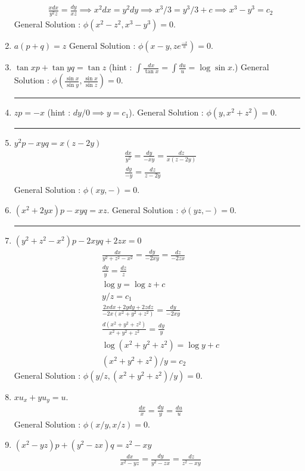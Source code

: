 \begin{enumerate}
\begin{align*}
			& \frac{xdx}{y^2z} = \frac{dy}{xz} \implies x^2dx = y^2dy \implies x^3/3 = y^3/3 + c \implies x^3-y^3 = c_2
		\end{align*}
		General Solution : $\phi(x^2-z^2,x^3-y^3) = 0$.
	\item $a(p+q) = z$
		General Solution : $\phi(x-y, ze^\frac{-x}{a}) = 0$.
	\item $\tan x p + \tan y q = \tan z$ 
		(hint : $\int \frac{dx}{\tan x} = \int \frac{du}{u} = \log \sin x$.)
		General Solution : $\phi\left(\frac{\sin x }{\sin y},\frac{\sin x}{\sin z}\right) = 0$.
		\hrule
	\item $zp = -x$
		(hint : $dy/0 \implies y = c_1$).
		General Solution : $\phi(y,x^2+z^2) = 0$.
		\hrule
	\item $y^2p - xyq = x(z-2y)$
		\begin{align*}
			& \frac{dx}{y^2} = \frac{dy}{-xy} = \frac{dz}{x(z-2y)} \\
			& \frac{dy}{-y} = \frac{dz}{z-2y} \\
		\end{align*}
		General Solution : $\phi(xy,-)= 0$.
	\item $(x^2+2yx)p - xyq = xz$.
		General Solution : $\phi(yz,-) = 0$.
		\hrule
	\item $(y^2+z^2-x^2)p - 2xyq + 2zx = 0$
		\begin{align*}
			& \frac{dx}{y^2+z^2-x^2} = \frac{dy}{-2xy} = \frac{dz}{-2zx} \\
			& \frac{dy}{y} = \frac{dz}{z} \\
			& \log y = \log z + c \\
			& y/z = c_1 \\
			& \frac{2xdx+2ydy+2zdz}{-2x(x^2+y^2+z^2)} = \frac{dy}{-2xy} \\
			& \frac{d(x^2+y^2+z^2)}{x^2+y^2+z^2} = \frac{dy}{y} \\
			& \log (x^2+y^2+z^2) = \log y + c \\
			& (x^2+y^2+z^2)/y = c_2
		\end{align*}
		General Solution : $\phi(y/z,(x^2+y^2+z^2)/y) = 0$.
	\item $xu_x + yu_y = u$.
		\begin{align*}
			& \frac{dx}{x} = \frac{dy}{y} = \frac{du}{u}
		\end{align*}
		General Solution : $\phi(x/y,x/z) = 0$.
	\item $(x^2-yz)p + (y^2 - zx)q = z^2-xy$
		\begin{align*}
			& \frac{dx}{x^2-yz} = \frac{dy}{y^2-zx} = \frac{dz}{z^2-xy} \\

\end{align*}
\end{enumerate}

